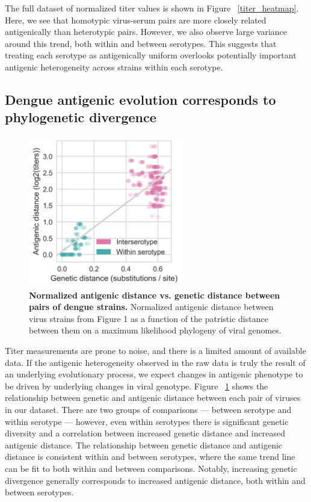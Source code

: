 \documentclass[11pt,oneside,letterpaper]{article}
\begin{document}
The full dataset of normalized titer values is shown in Figure ~\ref{titer_heatmap}.
Here, we see that homotypic virus-serum pairs are more closely related antigenically than heterotypic pairs.
However, we also observe large variance around this trend, both within and between serotypes.
This suggests that treating each serotype as antigenically uniform overlooks potentially important antigenic heterogeneity across strains within each serotype.

\subsection{Dengue antigenic evolution corresponds to phylogenetic divergence}

\begin{figure}[h]
  \begin{centering}
  \includegraphics[width=0.6\textwidth]{../figures/png/genetic_antigenic_distance.png}
  	\caption{\textbf{Normalized antigenic distance vs. genetic distance between pairs of dengue strains.}  Normalized antigenic distance between virus strains from Figure 1 as a function of the patristic distance between them on a maximum likelihood phylogeny of viral genomes.}
  	\label{genetic_antigenic_distance}
  \end{centering}
\end{figure}

Titer measurements are prone to noise, and there is a limited amount of available data.
If the antigenic heterogeneity observed in the raw data is truly the result of an underlying evolutionary process, we expect changes in antigenic phenotype to be driven by underlying changes in viral genotype.
Figure ~\ref{genetic_antigenic_distance} shows the relationship between genetic and antigenic distance between each pair of viruses in our dataset.
There are two groups of comparisons --- between serotype and within serotype --- however, even within serotypes there is significant genetic diversity and a correlation between increased genetic distance and increased antigenic distance.
The relationship between genetic distance and antigenic distance is consistent within and between serotypes, where the same trend line can be fit to both within and between comparisons.
Notably, increasing genetic divergence generally corresponds to increased antigenic distance, both within and between serotypes.
\end{document}
